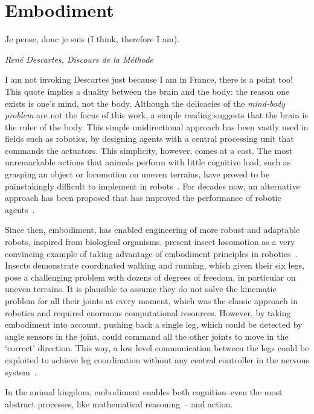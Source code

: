 \section{Embodiment}
\label{ch:intro:Embodiment}
\epigraph{Je pense, donc je suis (I think, therefore I am).}
{\textit{ Ren\'{e} Descartes, Discours de la M\'{e}thode}}
\noindent
I am not invoking Descartes just because I am in France, there is a point too!
This quote implies a duality between the brain and the body: the reason one exists is one's mind, not the body.
Although the delicacies of the \emph{mind-body problem} are not the focus of this work, a simple reading suggests that the brain is the ruler of the body.
This simple unidirectional approach has been vastly used in fields such as robotics, by designing agents with a central processing unit that commands the actuators.
This simplicity, however, comes at a cost.
The most unremarkable actions that animals perform with little cognitive load, such as grasping an object or locomotion on uneven terrains, have proved to be painstakingly difficult to implement in robots~\cite{Pfeifer2006Book}.
For decades now, an alternative approach has been proposed that has improved the performance of robotic agents~\cite{Brooks1991AI}.
\par
Since then, embodiment\footnotemark, has enabled engineering of more robust and adaptable robots, inspired from biological organisms.
\citeauthor{Pfeifer2007Sci} present insect locomotion as a very convincing example of taking advantage of embodiment principles in robotics~\cite{Pfeifer2007Sci}.
Insects demonstrate coordinated walking and running, which given their six legs, pose a challenging problem with dozens of degrees of freedom, in particular on uneven terrains.
It is plausible to assume they do not solve the kinematic problem for all their joints at every moment, which was the classic approach in robotics and required enormous computational resources.
However, by taking embodiment into account, pushing back a single leg, which could be detected by angle sensors in the joint, could command all the other joints to move in the `correct' direction.
This way, a low level communication between the legs could be exploited to achieve leg coordination without any central controller in the nervous system~\cite{Pfeifer2007Sci}.
\par
In the animal kingdom, embodiment enables both cognition--even the most abstract processes, like mathematical reasoning~\cite{Lakoff2000Book}-- and action.
